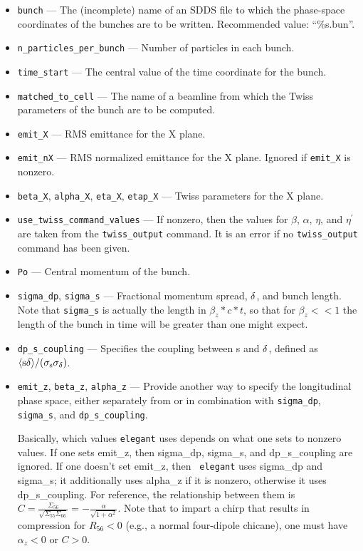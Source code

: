 \documentclass[11pt]{article}
\begin{document}
\begin{itemize}
\item \verb|bunch| --- The (incomplete) name of an SDDS file to which the phase-space coordinates
of the bunches are to be written.  Recommended value: ``\%s.bun''.  
\item \verb|n_particles_per_bunch| --- Number of particles in each bunch.
\item \verb|time_start| --- The central value of the time coordinate for the bunch.
\item \verb|matched_to_cell| --- The name of a beamline from which the Twiss parameters of the bunch
are to be computed.
\item \verb|emit_X| --- RMS emittance for the X plane.
\item \verb|emit_nX| --- RMS normalized emittance for the X plane.  Ignored if \verb|emit_X| is nonzero.
\item \verb|beta_X|, \verb|alpha_X|, \verb|eta_X|, \verb|etap_X| --- Twiss parameters for the X plane.
\item \verb|use_twiss_command_values| --- If nonzero, then the values for $\beta$, $\alpha$, 
        $\eta$, and $\eta^\prime$ are taken from the \verb|twiss_output| command.  It is an error if
        no \verb|twiss_output| command has been given.
\item \verb|Po| --- Central momentum of the bunch.
\item \verb|sigma_dp|, \verb|sigma_s| --- Fractional momentum spread, ${\rm \delta}$, and bunch length.
Note that \verb|sigma_s| is actually the length in $\beta_z*c*t$, so that for $\beta_z<<1$ the length of
the bunch in time will be greater than one might expect.
\item \verb|dp_s_coupling| ---  Specifies the coupling between s and ${\rm \delta}$, defined as 
${\rm \langle s \delta \rangle/(\sigma_s\sigma_\delta)}$.
\item \verb|emit_z|, \verb|beta_z|, \verb|alpha_z| --- Provide another way to specify the
 longitudinal phase space, either separately from or in combination with 
 \verb|sigma_dp|, \verb|sigma_s|, and \verb|dp_s_coupling|.  

Basically, which values {\tt elegant} uses depends on what one sets to
nonzero values.  If one sets emit\_z, then sigma\_dp, sigma\_s, and
dp\_s\_coupling are ignored.  If one doesn't set emit\_z, then {\tt
elegant} uses sigma\_dp and sigma\_s; it additionally uses alpha\_z if
it is nonzero, otherwise it uses dp\_s\_coupling.  For reference, the
relationship between them is $ C =
\frac{\Sigma_{56}}{\sqrt{\Sigma_{55}\Sigma_{66}}} =
-\frac{\alpha}{\sqrt{1+\alpha^2}}$.  Note that to impart a chirp that
results in compression for $R_{56}<0$ (e.g., a normal four-dipole
chicane), one must have $\alpha_z<0$ or $C>0$.


\end{itemize}
\end{document}
